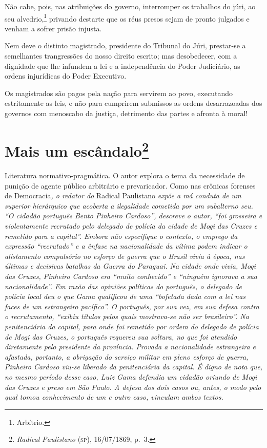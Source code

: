 Não cabe, pois, nas atribuições do governo, interromper os trabalhos do
júri, ao seu alvedrio,\footnote{Arbítrio.} privando destarte que os
réus presos sejam de pronto julgados e venham a sofrer prisão injusta.

Nem deve o distinto magistrado, presidente do Tribunal do Júri,
prestar-se a semelhantes trangressões do nosso direito escrito; mas
desobedecer, com a dignidade que lhe infundem a lei e a independência do
Poder Judiciário, as ordens injurídicas do Poder Executivo.

Os magistrados são pagos pela nação para servirem ao povo, executando
estritamente as leis, e não para cumprirem submissos as ordens
desarrazoadas dos governos com menoscabo da justiça, detrimento das
partes e afronta à moral!

\chapter{Mais um escândalo\footnote{\emph{Radical Paulistano} (\textsc{sp}),
  16/07/1869, p.~3.}}

\begin{didascalia}
Literatura normativo-pragmática. O autor explora o tema da necessidade
de punição de agente público arbitrário e prevaricador. Como nas
crônicas forenses de Democracia\emph{, o redator do} Radical Paulistano
\emph{expõe a má conduta de um superior hierárquico que acoberta a
ilegalidade cometida por um subalterno seu. ``O cidadão português Bento
Pinheiro Cardoso'', descreve o autor, ``foi grosseira e violentamente
recrutado pelo delegado de polícia da cidade de Mogi das Cruzes e
remetido para a capital''. Embora não especifique o contexto, o emprego
da expressão ``recrutado'' e a ênfase na nacionalidade da vítima podem
indicar o alistamento compulsório no esforço de guerra que o Brasil
vivia à época, nas últimas e decisivas batalhas da Guerra do Paraguai.
Na cidade onde vivia, Mogi das Cruzes, Pinheiro Cardoso era ``muito
conhecido'' e ``ninguém ignorava a sua nacionalidade''. Em razão das
opiniões políticas do português, o delegado de polícia local deu o que
Gama qualificou de uma ``bofetada dada com a lei nas faces de um
estrangeiro pacífico''. O português, por sua vez, em sua defesa contra o
recrutamento, ``exibiu títulos pelos quais mostrava-se não ser
brasileiro''. Na penitenciária da capital, para onde foi remetido por
ordem do delegado de polícia de Mogi das Cruzes, o português requereu
sua soltura, no que foi atendido diretamente pelo presidente da
província. Provada a nacionalidade estrangeira e afastada, portanto, a
obrigação do serviço militar em pleno esforço de guerra, Pinheiro
Cardoso viu-se liberado da penitenciária da capital. É digno de nota
que, no mesmo período desse caso, Luiz Gama defendia um cidadão oriundo
de Mogi das Cruzes e preso em São Paulo. A defesa dos dois casos ou,
antes, o modo pelo qual tomou conhecimento de um e outro caso, vinculam
ambos textos.}
\end{didascalia}



